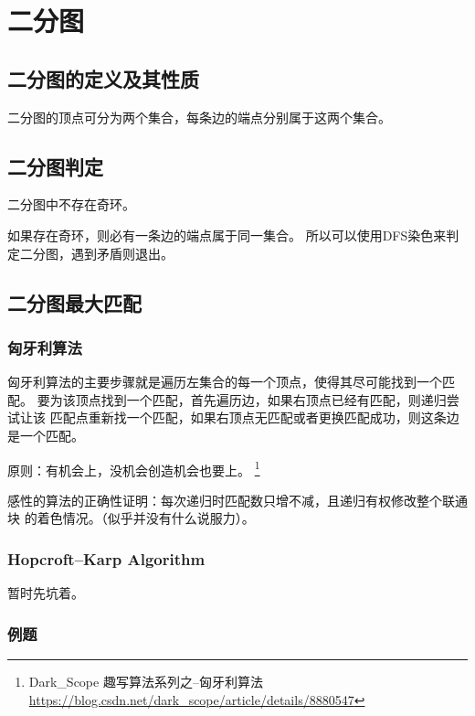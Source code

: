 \section{二分图}
\subsection{二分图的定义及其性质}
二分图的顶点可分为两个集合，每条边的端点分别属于这两个集合。
\subsection{二分图判定}
\begin{character}
	二分图中不存在奇环。
\end{character}
如果存在奇环，则必有一条边的端点属于同一集合。
所以可以使用DFS染色来判定二分图，遇到矛盾则退出。



\subsection{二分图最大匹配}

\subsubsection{匈牙利算法}

匈牙利算法的主要步骤就是遍历左集合的每一个顶点，使得其尽可能找到一个匹配。
要为该顶点找到一个匹配，首先遍历边，如果右顶点已经有匹配，则递归尝试让该
匹配点重新找一个匹配，如果右顶点无匹配或者更换匹配成功，则这条边是一个匹配。

原则：有机会上，没机会创造机会也要上。
\footnote{Dark\_Scope 趣写算法系列之--匈牙利算法
	\url{https://blog.csdn.net/dark\_scope/article/details/8880547}}

感性的算法的正确性证明：每次递归时匹配数只增不减，且递归有权修改整个联通块
的着色情况。（似乎并没有什么说服力）。


\subsubsection{Hopcroft–Karp Algorithm}
暂时先坑着。

\subsubsection{例题}

